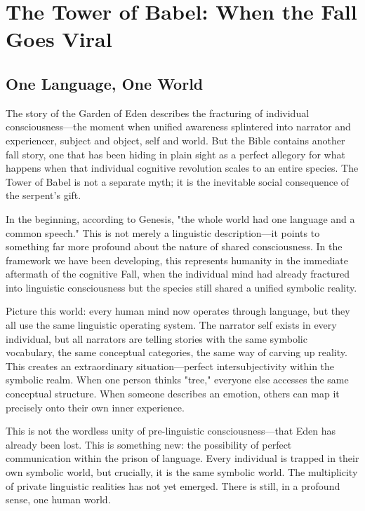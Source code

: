 \chapter{The Tower of Babel: When the Fall Goes Viral}

\section{One Language, One World}

The story of the Garden of Eden describes the fracturing of individual consciousness—the moment when unified awareness splintered into narrator and experiencer, subject and object, self and world. But the Bible contains another fall story, one that has been hiding in plain sight as a perfect allegory for what happens when that individual cognitive revolution scales to an entire species. The Tower of Babel is not a separate myth; it is the inevitable social consequence of the serpent's gift.

In the beginning, according to Genesis, "the whole world had one language and a common speech." This is not merely a linguistic description—it points to something far more profound about the nature of shared consciousness. In the framework we have been developing, this represents humanity in the immediate aftermath of the cognitive Fall, when the individual mind had already fractured into linguistic consciousness but the species still shared a unified symbolic reality.

Picture this world: every human mind now operates through language, but they all use the same linguistic operating system. The narrator self exists in every individual, but all narrators are telling stories with the same symbolic vocabulary, the same conceptual categories, the same way of carving up reality. This creates an extraordinary situation—perfect intersubjectivity within the symbolic realm. When one person thinks "tree," everyone else accesses the same conceptual structure. When someone describes an emotion, others can map it precisely onto their own inner experience.

This is not the wordless unity of pre-linguistic consciousness—that Eden has already been lost. This is something new: the possibility of perfect communication within the prison of language. Every individual is trapped in their own symbolic world, but crucially, it is the same symbolic world. The multiplicity of private linguistic realities has not yet emerged. There is still, in a profound sense, one human world.


